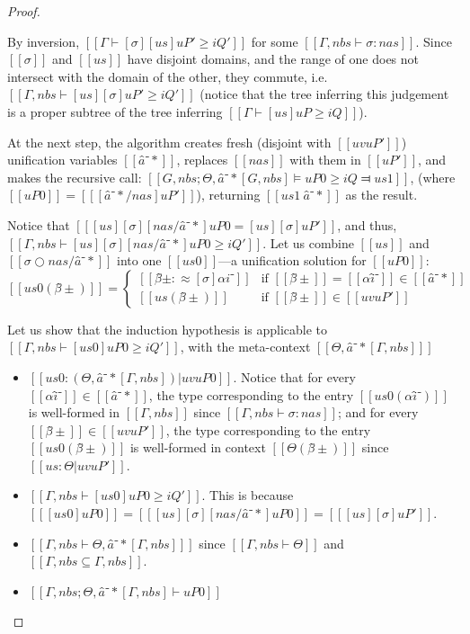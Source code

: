 \begin{proof}
\begin{caseof}
      By inversion, $[[ Γ ⊢ [σ][us]uP' ≥ iQ' ]]$ for some $[[Γ, nbs ⊢ σ : nas]]$.
      Since $[[σ]]$ and $[[us]]$ have disjoint domains,
      and the range of one does not intersect with the domain of the other,
      they commute, i.e. $[[ Γ, nbs ⊢ [us][σ]uP' ≥ iQ' ]]$
      (notice that the tree inferring this judgement is 
      a proper subtree of the tree inferring 
      $[[ Γ ⊢ [us]uP ≥ iQ ]]$).

      At the next step, 
      the algorithm creates fresh (disjoint with $[[uv uP']]$) 
      unification variables $[[â⁻*]]$, replaces $[[nas]]$ with them in $[[ uP' ]]$,
      and makes the recursive call:
      $[[G, nbs; Θ, â⁻*[G, nbs] ⊨ uP0 ≥ iQ ⫤ us1]]$,
      (where $[[uP0]] = [[ [â⁻*/nas]uP' ]]$),
      returning $[[us1 \ {â⁻*}]]$ as the result.

       Notice that $[[ [us][σ][nas/â⁻*]uP0 = [us][σ]uP' ]]$,
       and thus, $[[ Γ, nbs ⊢ [us][σ][nas/â⁻*]uP0 ≥ iQ' ]]$.
       Let us combine $[[us]]$ and $[[σ  ○ nas/â⁻*]]$ into one 
       $[[us0]]$---a unification solution for $[[uP0]]$:
        \[
            [[us0(β̂±)]]  = 
            \begin{cases}
               [[ β̂± :≈ [σ]αi⁻ ]] & \text{if } [[β̂±]] = [[αî⁻]] \in [[â⁻*]] \\
               [[us(β̂±)]] & \text{if } [[β̂±]] \in [[uv uP']]
            \end{cases}
       \]

       Let us show that the induction hypothesis is applicable to 
       $[[Γ, nbs ⊢ [us0]uP0 ≥ iQ' ]]$, with the meta-context $[[ Θ, â⁻*[Γ, nbs] ]]$
       \begin{itemize}
        \item $[[ us0 : (Θ, â⁻*[Γ, nbs])|uv uP0 ]]$. Notice that for every $[[αî⁻]] \in [[â⁻*]]$, 
            the type corresponding to the entry $[[us0(αî⁻)]]$ 
            is well-formed in $[[Γ, nbs]]$ since $[[Γ, nbs ⊢ σ : nas ]]$;
            and for every $[[β̂±]] \in [[uv uP']]$, 
            the type corresponding to the entry $[[us0(β̂±)]]$ is well-formed in
            context $[[Θ(β̂±)]]$ since $[[us : Θ | uv uP']]$.
        \item $[[Γ, nbs ⊢ [us0]uP0 ≥ iQ' ]]$. This is because
            $[[ [us0]uP0 ]] = [[ [us][σ][nas/â⁻*]uP0 ]] = [[ [us][σ]uP' ]]$.
        \item $[[ Γ, nbs ⊢ Θ, â⁻*[Γ, nbs] ]]$ since
            $[[Γ, nbs ⊢ Θ]]$ and $[[ {Γ, nbs} ⊆ {Γ, nbs} ]]$.
        \item $[[Γ, nbs ; Θ, â⁻*[Γ, nbs] ⊢ uP0 ]]$
       \end{itemize}


\end{caseof}
\end{proof}

